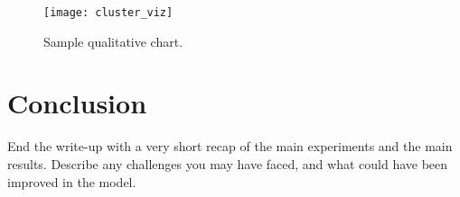 \documentclass[11pt]{article}
\begin{document}
\begin{figure}
  \centering
  \texttt{[image: cluster\_viz]}
  \caption{\label{fig:clusters} Sample qualitative chart.}
\end{figure}


\section{Conclusion}

End the write-up with a very short recap of the main experiments and the main
results. Describe any challenges you may have faced, and what could have been
improved in the model.



\end{document}
